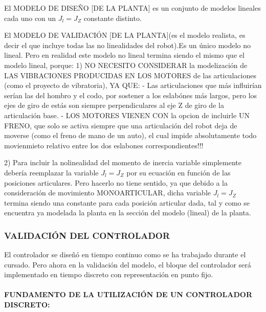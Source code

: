 \documentclass{article}
\begin{document}
\begin{sloppypar}
El MODELO DE DISEÑO [DE LA PLANTA] es un conjunto de modelos lineales cada uno con un $J_l=J_Z$ constante distinto.

El MODELO DE VALIDACIÓN [DE LA PLANTA](es el modelo realista, es decir el que incluye todas las no linealidades del robot).Es un único modelo no lineal. Pero en realidad este modelo no lineal termina siendo el mismo que el modelo lineal, porque:
        1) NO NECESITO CONSIDERAR la modelización de LAS VIBRACIONES PRODUCIDAS EN LOS MOTORES de las articulaciones (como el proyecto de vibratoria), YA QUE:
                - Las articulaciones que más influirían serían las del hombro y el codo, por sostener a los eslabónes más largos, pero los ejes de giro de estás son siempre perpendiculares al eje Z de giro de la articulación base.
                - LOS MOTORES VIENEN CON la opcion de incluirle UN FRENO, que solo se activa siempre que una articulación del robot deja de moverse (como el freno de mano de un auto), el cual impide absolutamente todo movienmieto relativo entre los dos eslabones correspondientes!!! %

        2) Para incluir la nolinealidad del momento de inercia variable simplemente debería reemplazar la variable $J_l=J_Z$ por su ecuación en función de las posiciones articulares. Pero hacerlo no tiene sentido, ya que debido a la consideración de movimiento MONOARTICULAR, dicha variable $J_l=J_Z$ termina siendo una constante para cada posición articular dada, tal y como se encuentra ya modelada la planta en la sección del modelo (lineal) de la planta.

\subsubsection{VALIDACIÓN DEL CONTROLADOR}
\label{sec:VALIDACIÓN DEL CONTROLADOR}
El controlador se diseñó en tiempo continuo como se ha trabajado durante el cursado. Pero ahora en la validación del modelo, el bloque del controlador será implementado en tiempo discreto con representación en punto fijo.

\paragraph{FUNDAMENTO DE LA UTILIZACIÓN DE UN CONTROLADOR DISCRETO:}
\label{sec:FUNDAMENTO DE LA UTILIZACIÓN DE UN CONTROLADOR DISCRETO:}
\hfill

\hfill






\end{sloppypar}
\end{document}
